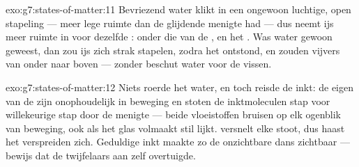 \begin{solution}{exo:g7:states-of-matter:11}
Bevriezend water klikt in een ongewoon luchtige, open stapeling ---
meer lege ruimte dan de glijdende menigte had --- dus neemt ijs meer
ruimte in voor dezelfde :  onder die van de
, en het . Was water gewoon geweest, dan zou ijs
zich strak stapelen,  zodra het ontstond, en zouden vijvers van
onder naar boven  --- zonder beschut water voor de vissen.
\end{solution}

\begin{solution}{exo:g7:states-of-matter:12}
Niets roerde het water, en toch reisde de inkt: de eigen
 van de  zijn onophoudelijk in beweging en stoten
de inktmoleculen stap voor willekeurige stap door de menigte ---
beide vloeistoffen bruisen op elk ogenblik van beweging, ook als het
glas volmaakt stil lijkt.  versnelt elke stoot, dus haast het
verspreiden zich. Geduldige inkt maakte zo de onzichtbare dans
zichtbaar --- bewijs dat de twijfelaars aan  zelf overtuigde.
\end{solution}

